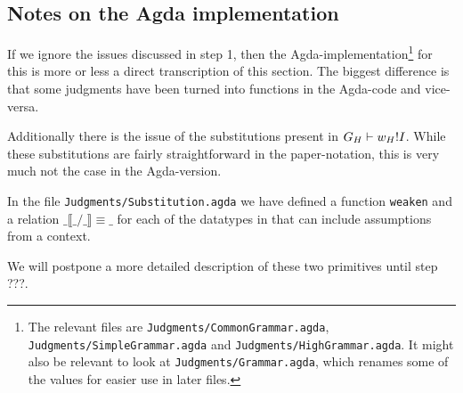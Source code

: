 \subsection{Notes on the Agda implementation}

If we ignore the issues discussed in step 1, then the
Agda-implementation\footnote{The relevant files are
  \texttt{Judgments/CommonGrammar.agda}, \texttt{Judgments/SimpleGrammar.agda}
  and \texttt{Judgments/HighGrammar.agda}. It might also be relevant to look at
  \texttt{Judgments/Grammar.agda}, which renames some of the values for easier
  use in later files.} for this is more or less a direct transcription of this
section. The biggest difference is that some judgments have been turned into
functions in the Agda-code and vice-versa.

Additionally there is the issue of the substitutions present in
${{G_H}} |- {{w_H}} ! {I}$. While these substitutions are fairly
straightforward in the paper-notation, this is very much not the case in the
Agda-version.

In the file \texttt{Judgments/Substitution.agda} we have defined a function
\texttt{weaken} and a relation $\mathtt{\_\llbracket\_/\_\rrbracket\equiv\_}$
for each of the datatypes in \highlang that can include assumptions from a
context.

We will postpone a more detailed description of these two primitives until step
???.

